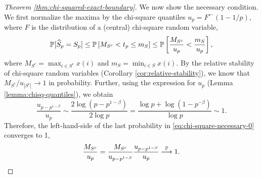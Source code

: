 \begin{proof}[Theorem \ref{thm:chi-squared-exact-boundary}]
We now show the necessary condition. 
We first normalize the maxima by the chi-square quantiles $u_p = F^{\leftarrow}(1-1/p)$, where $F$ is the distribution of a (central) chi-square random variable,
\begin{equation} \label{eq:chi-square-necessary-0}
 \P[\widehat{S}_p = S_p] \le \P\left[M_{S^c} <  t_p \le m_{S} \right]
  \le \P\left[ \frac{M_{S^c}}{u_p} < \frac{m_S}{u_p} \right],
\end{equation}
where $M_{S^c} = \max_{i\in S^c}x(i)$ and $m_{S} = \min_{i\in S}x(i)$.
By the relative stability of chi-square random variables (Corollary \ref{cor:relative-stability}), we know that ${M_{S^c}}/{u_{|S^c|}}\to1$ in probability. 
Further, using the expression for $u_p$ (Lemma \ref{lemma:chisq-quantiles}), we obtain
$$
\frac{u_{p-p^{1-\beta}}}{u_{p}} \sim \frac{2\log{(p-p^{1-\beta})}}{2\log{p}} = \frac{\log{p}+\log{(1-p^{-\beta})}}{\log{p}} \sim 1.
$$
Therefore, the left-hand-side of the last probability in \eqref{eq:chi-square-necessary-0} converges to 1,
\begin{equation} \label{eq:chi-square-necessary-1}
    \frac{M_{S^c}}{u_{p}} = \frac{M_{S^c}}{u_{p-p^{1-\beta}}} \frac{u_{p-p^{1-\beta}}}{u_{p}} \stackrel{\P}{\longrightarrow} 1.
\end{equation}


\end{proof}
